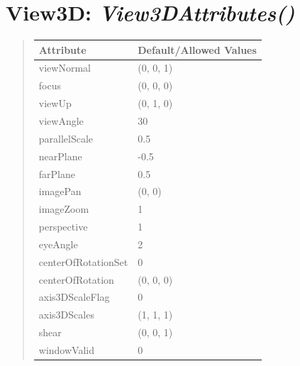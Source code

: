 \documentclass[letterpaper,10pt,english]{sphinxmanual}
\begin{document}
\section{\textbf{View3D}: \emph{View3DAttributes()}}
\label{attributes:view3d-view3dattributes}
\begin{DUlineblock}{0em}
\item[] 
\end{DUlineblock}
\begin{quote}

\begin{tabulary}{\linewidth}{|L|L|}
\hline

\textbf{Attribute}
 & 
\textbf{Default/Allowed Values}
\\
\hline
viewNormal
 & 
(0, 0, 1)
\\
\hline
focus
 & 
(0, 0, 0)
\\
\hline
viewUp
 & 
(0, 1, 0)
\\
\hline
viewAngle
 & 
30
\\
\hline
parallelScale
 & 
0.5
\\
\hline
nearPlane
 & 
-0.5
\\
\hline
farPlane
 & 
0.5
\\
\hline
imagePan
 & 
(0, 0)
\\
\hline
imageZoom
 & 
1
\\
\hline
perspective
 & 
1
\\
\hline
eyeAngle
 & 
2
\\
\hline
centerOfRotationSet
 & 
0
\\
\hline
centerOfRotation
 & 
(0, 0, 0)
\\
\hline
axis3DScaleFlag
 & 
0
\\
\hline
axis3DScales
 & 
(1, 1, 1)
\\
\hline
shear
 & 
(0, 0, 1)
\\
\hline
windowValid
 & 
0
\\
\hline\end{tabulary}

\end{quote}

\begin{DUlineblock}{0em}
\item[] 
\end{DUlineblock}

\begin{DUlineblock}{0em}
\item[] 
\end{DUlineblock}
\end{document}
